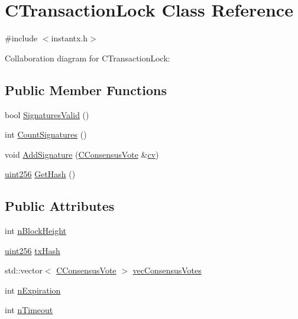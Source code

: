 \hypertarget{class_c_transaction_lock}{}\section{C\+Transaction\+Lock Class Reference}
\label{class_c_transaction_lock}


{\ttfamily \#include $<$instantx.\+h$>$}



Collaboration diagram for C\+Transaction\+Lock\+:
\subsection*{Public Member Functions}
\begin{DoxyCompactItemize}
\item 
bool \hyperlink{class_c_transaction_lock_a71cb6705a8f0bfb4a8453d3b284e3cf7}{Signatures\+Valid} ()
\item 
int \hyperlink{class_c_transaction_lock_aa74b16eec6daee397785a91193fc3306}{Count\+Signatures} ()
\item 
void \hyperlink{class_c_transaction_lock_a8f09c2c0453950fb6deadcccf5f518d7}{Add\+Signature} (\hyperlink{class_c_consensus_vote}{C\+Consensus\+Vote} \&\hyperlink{db__bench_8cc_aa35826d3f6dc34ef1f1b35dee6db9d91}{cv})
\item 
\hyperlink{classuint256}{uint256} \hyperlink{class_c_transaction_lock_a2142d2e27db93d33ac93761058f8d803}{Get\+Hash} ()
\end{DoxyCompactItemize}
\subsection*{Public Attributes}
\begin{DoxyCompactItemize}
\item 
int \hyperlink{class_c_transaction_lock_a358a18da2b8b378cc7cd1dae145f611f}{n\+Block\+Height}
\item 
\hyperlink{classuint256}{uint256} \hyperlink{class_c_transaction_lock_a9d4babccfcdf7fe3806dd3ec1b56d08a}{tx\+Hash}
\item 
std\+::vector$<$ \hyperlink{class_c_consensus_vote}{C\+Consensus\+Vote} $>$ \hyperlink{class_c_transaction_lock_a399f0d14a38794034c5f530599e95b3a}{vec\+Consensus\+Votes}
\item 
int \hyperlink{class_c_transaction_lock_aec15172be9c7f1cbe4b989387fdb1b52}{n\+Expiration}
\item 
int \hyperlink{class_c_transaction_lock_a8c18d2530bfcea24bee8d5773d12c0a9}{n\+Timeout}
\end{DoxyCompactItemize}


